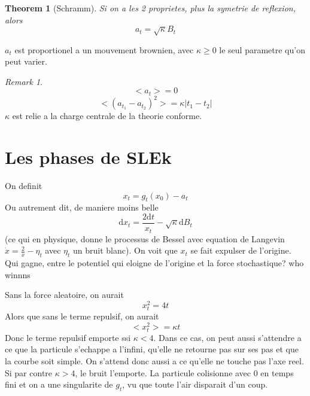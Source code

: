 \documentclass[a4paper]{book}
\newtheorem{theorem}{Theorem}[section]
\theoremstyle{definition}
\theoremstyle{remark}
\newtheorem*{remark}{Remark}
\begin{document}
\begin{theorem}[Schramm] Si on a les 2 proprietes, plus la symetrie de reflexion, alors 
    \begin{equation}
        a_t = \sqrt{\kappa} B_t
    \end{equation}
\end{theorem}
$a_t$ est proportionel a un mouvement brownien, avec $\kappa \geq 0$ le seul parametre qu'on peut varier. 
\begin{remark}
    \begin{equation}
        <a_t> = 0
    \end{equation}
    \begin{equation}
        <(a_{t_1} - a_{t_2})^2> = \kappa |t_1-t_2|
    \end{equation}
    $\kappa$ est relie a la charge centrale de la theorie conforme. 
\end{remark}

\section{Les phases de SLEk}
On definit 
\begin{equation}
    x_t = g_t(x_0) - a_t
\end{equation}
Ou autrement dit, de maniere moins belle
\begin{equation}
    \text{d}x_t = \frac{2\text{d}t}{x_t} - \sqrt{\kappa}\text{d}B_t
\end{equation}
(ce qui en physique, donne le processus de Bessel avec equation de Langevin $\dot x = \frac{2}{x} - \eta_t$ avec $\eta_t$ un bruit blanc). 
On voit que $x_t$ se fait expulser de l'origine. Qui gagne, entre le potentiel qui eloigne de l'origine et la force stochastique? who winnns \par \medskip 

Sans la force aleatoire, on aurait 
\begin{equation}
    x_t^2 = 4t
\end{equation}
Alors que sans le terme repulsif, on aurait
\begin{equation}
    <x_t^2> = \kappa t 
\end{equation}
Donc le terme repulsif emporte ssi $\kappa < 4$. Dans ce cas, on peut aussi s'attendre a ce que la particule s'echappe a l'infini, qu'elle ne retourne pas sur ses pas et que la courbe soit simple. On s'attend donc aussi a ce qu'elle ne touche pas l'axe reel. Si par contre $\kappa > 4$, le bruit l'emporte. La particule colisionne avec 0 en temps fini et on a une singularite de $g_t$, vu que toute l'air disparait d'un coup. \par \medskip 
\end{document}
